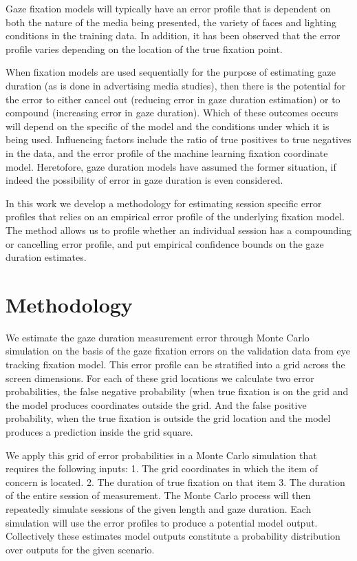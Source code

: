 \documentclass[12pt,a4paper]{article}
\numberwithin{equation}{section}
\begin{document}
Gaze fixation models will typically have an error profile that is dependent on both 
the nature of the media being presented, the variety of faces and lighting conditions 
in the training data. In addition, it has been observed that the error profile varies 
depending on the location of the true fixation point.

When fixation models are used sequentially for the purpose of estimating gaze duration 
(as is done in advertising media studies), then there is the potential for the error 
to either cancel out (reducing error in gaze duration estimation) or to compound 
(increasing error in gaze duration). Which of these outcomes occurs will depend on the 
specific of the model and the conditions under which it is being used.
Influencing factors include the ratio of true positives to true negatives in the data, 
and the error profile of the machine learning fixation coordinate model. 
Heretofore, gaze duration models have assumed the former situation, if indeed the possibility of error in gaze duration is even considered.

In this work we develop a methodology for estimating session specific error profiles that relies on an empirical error profile of the underlying fixation model. The method allows us to profile whether an individual session has a compounding or cancelling error profile, and put empirical confidence bounds on the gaze duration estimates.

\section{Methodology}

We estimate the gaze duration measurement error through Monte Carlo simulation
on the basis of the gaze fixation errors on the validation data from eye tracking
fixation model. This error profile can be stratified into a grid across the screen dimensions. For each of these grid locations we calculate two error probabilities, the false negative probability (when true fixation is on the grid and the model produces coordinates outside the grid. And the false positive probability, when the true fixation is outside the grid location and the model produces a prediction inside the grid square.

We apply this grid of error probabilities in a Monte Carlo simulation that requires the following inputs:
1.	The grid coordinates in which the item of concern is located.
2.	The duration of true fixation on that item
3.	The duration of the entire session of measurement.
The Monte Carlo process will then repeatedly simulate sessions of the given length and gaze duration. Each simulation will use the error profiles to produce a potential model output. Collectively these estimates model outputs constitute a probability distribution over outputs for the given scenario.
\end{document}
